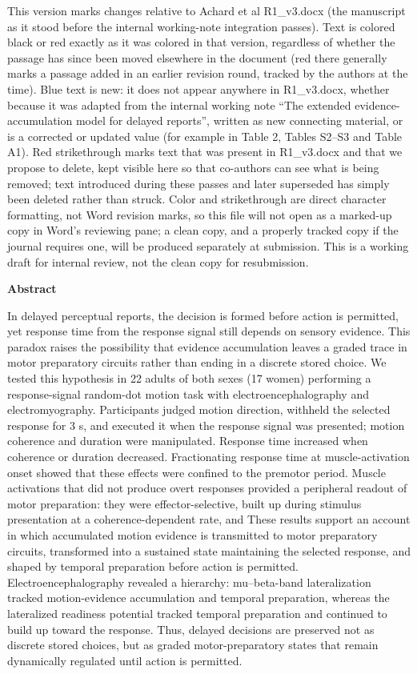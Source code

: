This version marks changes relative to Achard et al R1\_v3.docx (the manuscript as it stood before the internal working-note integration passes). Text is colored black or red exactly as it was colored in that version, regardless of whether the passage has since been moved elsewhere in the document (red there generally marks a passage added in an earlier revision round, tracked by the authors at the time). Blue text is new: it does not appear anywhere in R1\_v3.docx, whether because it was adapted from the internal working note ``The extended evidence-accumulation model for delayed reports'', written as new connecting material, or is a corrected or updated value (for example in Table 2, Tables S2--S3 and Table A1). Red strikethrough marks text that was present in R1\_v3.docx and that we propose to delete, kept visible here so that co-authors can see what is being removed; text introduced during these passes and later superseded has simply been deleted rather than struck. Color and strikethrough are direct character formatting, not Word revision marks, so this file will not open as a marked-up copy in Word's reviewing pane; a clean copy, and a properly tracked copy if the journal requires one, will be produced separately at submission. This is a working draft for internal review, not the clean copy for resubmission.

\textbf{Abstract}

In delayed perceptual reports, the decision is formed before action is permitted, yet response time from the response signal still depends on sensory evidence. This paradox raises the possibility that evidence accumulation leaves a graded trace in motor preparatory circuits rather than ending in a discrete stored choice. We tested this hypothesis in 22 adults of both sexes (17 women) performing a response-signal random-dot motion task with electroencephalography and electromyography. Participants judged motion direction, withheld the selected response for 3 s, and executed it when the response signal was presented; motion coherence and duration were manipulated. Response time increased when coherence or duration decreased.  Fractionating response time at muscle-activation onset showed that these effects were confined to the premotor period. Muscle activations that did not produce overt responses provided a peripheral readout of motor preparation: they were effector-selective, built up during stimulus presentation at a coherence-dependent rate, and  These results support an account in which accumulated motion evidence is transmitted to motor preparatory circuits, transformed into a sustained state maintaining the selected response, and shaped by temporal preparation before action is permitted. Electroencephalography revealed a hierarchy: mu--beta-band lateralization tracked motion-evidence accumulation and temporal preparation, whereas the lateralized readiness potential tracked temporal preparation and continued to build up toward the response. Thus, delayed decisions are preserved not as discrete stored choices, but as graded motor-preparatory states that remain dynamically regulated until action is permitted.

